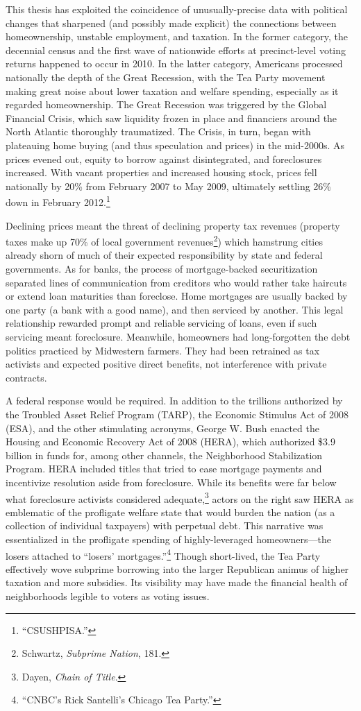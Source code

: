 \documentclass[12pt,oneside]{psthesis}
\begin{document}
This thesis has exploited the coincidence of unusually-precise data with political changes that sharpened (and possibly made explicit) the connections between homeownership, unstable employment, and taxation.
In the former category, the decennial census and the first wave of nationwide efforts at precinct-level voting returns happened to occur in 2010.
In the latter category, Americans processed nationally the depth of the Great Recession, with the Tea Party movement making great noise about lower taxation and welfare spending, especially as it regarded homeownership.
The Great Recession was triggered by the Global Financial Crisis, which saw liquidity frozen in place and financiers around the North Atlantic thoroughly traumatized.
The Crisis, in turn, began with plateauing home buying (and thus speculation and prices) in the mid-2000s.
As prices evened out, equity to borrow against disintegrated, and foreclosures increased.
With vacant properties and increased housing stock, prices fell nationally by 20\% from February 2007 to May 2009, ultimately settling 26\% down in February 2012.\footnote{``CSUSHPISA.''}

Declining prices meant the threat of declining property tax revenues (property taxes make up 70\% of local government revenues\footnote{Schwartz, \emph{Subprime Nation}, 181.}) which hamstrung cities already shorn of much of their expected responsibility by state and federal governments.
As for banks, the process of mortgage-backed securitization separated lines of communication from creditors who would rather take haircuts or extend loan maturities than foreclose.
Home mortgages are usually backed by one party (a bank with a good name), and then serviced by another.
This legal relationship rewarded prompt and reliable servicing of loans, even if such servicing meant foreclosure.
Meanwhile, homeowners had long-forgotten the debt politics practiced by Midwestern farmers.
They had been retrained as tax activists and expected positive direct benefits, not interference with private contracts.

A federal response would be required.
In addition to the trillions authorized by the Troubled Asset Relief Program (TARP), the Economic Stimulus Act of 2008 (ESA), and the other stimulating acronyms, George W. Bush enacted the Housing and Economic Recovery Act of 2008 (HERA), which authorized \$3.9 billion in funds for, among other channels, the Neighborhood Stabilization Program.
HERA included titles that tried to ease mortgage payments and incentivize resolution aside from foreclosure.
While its benefits were far below what foreclosure activists considered adequate,\footnote{Dayen, \emph{Chain of Title}.} actors on the right saw HERA as emblematic of the profligate welfare state that would burden the nation (as a collection of individual taxpayers) with perpetual debt.
This narrative was essentialized in the profligate spending of highly-leveraged homeowners---the losers attached to ``losers' mortgages.''\footnote{``CNBC's Rick Santelli's Chicago Tea Party.''}
Though short-lived, the Tea Party effectively wove subprime borrowing into the larger Republican animus of higher taxation and more subsidies.
Its visibility may have made the financial health of neighborhoods legible to voters as voting issues.
\end{document}
